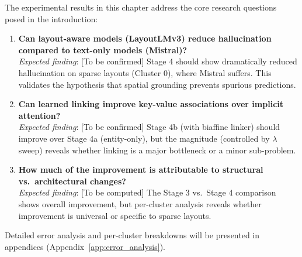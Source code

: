 The experimental results in this chapter address the core research questions posed in the introduction:

\begin{enumerate}
    \item \textbf{Can layout-aware models (LayoutLMv3) reduce hallucination compared to text-only models (Mistral)?}
    \\[2mm]
    \textit{Expected finding}: [To be confirmed] Stage 4 should show dramatically reduced hallucination on sparse layouts (Cluster 0), where Mistral suffers. This validates the hypothesis that spatial grounding prevents spurious predictions.
    
    \item \textbf{Can learned linking improve key-value associations over implicit attention?}
    \\[2mm]
    \textit{Expected finding}: [To be confirmed] Stage 4b (with biaffine linker) should improve over Stage 4a (entity-only), but the magnitude (controlled by $\lambda$ sweep) reveals whether linking is a major bottleneck or a minor sub-problem.
    
    \item \textbf{How much of the improvement is attributable to structural vs.\ architectural changes?}
    \\[2mm]
    \textit{Expected finding}: [To be computed] The Stage 3 vs.\ Stage 4 comparison shows overall improvement, but per-cluster analysis reveals whether improvement is universal or specific to sparse layouts.
\end{enumerate}

Detailed error analysis and per-cluster breakdowns will be presented in appendices (Appendix~\ref{app:error_analysis}).
